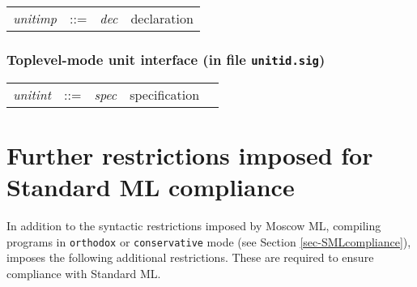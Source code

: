 \documentclass[fleqn,a4paper]{article}
\begin{document}
\begin{tabular}{llll}
{\it unitimp\/} & ::= & {\it dec\/} & declaration \\
\end{tabular}

\subsubsection*{Toplevel-mode unit interface (in file {\tt unitid.sig})}

\begin{tabular}{lllll}
{\it unitint\/} & ::=   & {\it spec\/} & specification \\
\end{tabular}

\newpage

\section{Further restrictions imposed for Standard ML compliance}\label{sec-SMLrestrictions}

In addition to the syntactic restrictions imposed by Moscow ML,
compiling programs in {\tt orthodox} or {\tt conservative} mode (see Section
\ref{sec-SMLcompliance}),
imposes the following additional restrictions. These
are required to ensure compliance with Standard ML.
\end{document}
